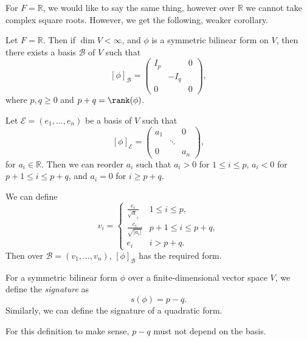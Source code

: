 \documentclass[12pt]{article}
\begin{document}
For $F = \mathbb{R}$, we would like to say the same thing, however over $\mathbb{R}$ we cannot take complex square roots. However, we get the following, weaker corollary.

\begin{corollary}
	Let $F = \mathbb{R}$. Then if $\dim V < \infty$, and $\phi$ is a symmetric bilinear form on $V$, then there exists a basis $\mathcal{B}$ of $V$ such that
	\[
		[\phi]_{\mathcal{B}} =
		\begin{pmatrix}
			I_p & & 0 \\
			    & -I_q & \\
			0 & & 0
		\end{pmatrix}
	,\]
	where $p, q \geq 0$ and $p + q = \rank(\phi)$.
\end{corollary}

\begin{proofbox}
	Let $\mathcal{E} = (e_1, \ldots, e_n)$ be a basis of $V$ such that
	\[
		[\phi]_{\mathcal{E}} =
		\begin{pmatrix}
			a_1 & & 0 \\
			    & \ddots & \\
			0 & & a_n
		\end{pmatrix}
	,\]
	for $a_i \in \mathbb{R}$. Then we can reorder $a_i$ such that $a_i > 0$ for $1 \leq i \leq p$, $a_i < 0$ for $p+1 \leq i \leq p+q$, and $a_i = 0$ for $i \geq p+q$.

	We can define
	\[
	v_i =
	\begin{cases}
		\frac{e_i}{\sqrt a_i} & 1 \leq i \leq p, \\
		\frac{e_i}{\sqrt{|a_i|}} & p+1 \leq i \leq p+q, \\
		e_i & i > p+q.
	\end{cases}
	\]
	Then over $\mathcal{B} = (v_1, \ldots, v_n)$, $[\phi]_{\mathcal{B}}$ has the required form.
\end{proofbox}

\begin{definition}[Signature]
	For a symmetric bilinear form $\phi$ over a finite-dimensional vector space $V$, we define the \textit{signature} as
	\[
	s(\phi) = p - q
	.\]
	Similarly, we can define the signature of a quadratic form.
\end{definition}

For this definition to make sense, $p - q$ must not depend on the basis.
\end{document}
